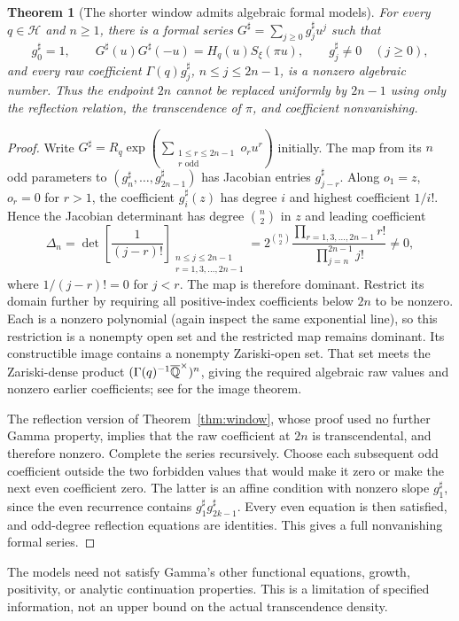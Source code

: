 \documentclass[11pt,a4paper]{article}
\newtheorem{theorem}{Theorem}[section]
\theoremstyle{definition}\newtheorem{definition}[theorem]{Definition}
\theoremstyle{remark}\newtheorem{remark}[theorem]{Remark}
\begin{document}
\begin{theorem}[The shorter window admits algebraic formal models]\label{thm:windowsharp}
For every $q\in\mathcal H$ and $n\ge1$, there is a formal series $G^\sharp=\sum_{j\ge0}g_j^\sharp u^j$ such that
\[
g_0^\sharp=1,\qquad
G^\sharp(u)G^\sharp(-u)=H_q(u)S_\xi(\pi u),\qquad g_j^\sharp\ne0\quad(j\ge0),
\]
and every raw coefficient $\Gamma(q)g_j^\sharp$, $n\le j\le2n-1$, is a nonzero algebraic number. Thus the endpoint $2n$ cannot be replaced uniformly by $2n-1$ using only the reflection relation, the transcendence of $\pi$, and coefficient nonvanishing.
\end{theorem}
\begin{proof}
Write $G^\sharp=R_q\exp(\sum_{\substack{1\le r\le2n-1\\r\text{ odd}}}o_ru^r)$ initially. The map from its $n$ odd parameters to $(g_n^\sharp,\ldots,g_{2n-1}^\sharp)$ has Jacobian entries $g_{j-r}^\sharp$. Along $o_1=z$, $o_r=0$ for $r>1$, the coefficient $g_i^\sharp(z)$ has degree $i$ and highest coefficient $1/i!$. Hence the Jacobian determinant has degree $\binom n2$ in $z$ and leading coefficient
\[
\Delta_n=\det\left[\frac1{(j-r)!}\right]_{\substack{n\le j\le2n-1\\r=1,3,\ldots,2n-1}}
=2^{\binom n2}\frac{\prod_{r=1,3,\ldots,2n-1}r!}{\prod_{j=n}^{2n-1}j!}\ne0,
\]
where $1/(j-r)!=0$ for $j<r$. The map is therefore dominant. Restrict its domain further by requiring all positive-index coefficients below $2n$ to be nonzero. Each is a nonzero polynomial (again inspect the same exponential line), so this restriction is a nonempty open set and the restricted map remains dominant. Its constructible image contains a nonempty Zariski-open set. That set meets the Zariski-dense product $(\Gamma(q)^{-1}\overline{\mathbb Q}^\times)^n$, giving the required algebraic raw values and nonzero earlier coefficients; see \cite{CLO} for the image theorem.

The reflection version of Theorem~\ref{thm:window}, whose proof used no further Gamma property, implies that the raw coefficient at $2n$ is transcendental, and therefore nonzero. Complete the series recursively. Choose each subsequent odd coefficient outside the two forbidden values that would make it zero or make the next even coefficient zero. The latter is an affine condition with nonzero slope $g_1^\sharp$, since the even recurrence contains $g_1^\sharp g_{2k-1}^\sharp$. Every even equation is then satisfied, and odd-degree reflection equations are identities. This gives a full nonvanishing formal series.
\end{proof}
The models need not satisfy Gamma's other functional equations, growth, positivity, or analytic continuation properties. This is a limitation of specified information, not an upper bound on the actual transcendence density.
\end{document}
